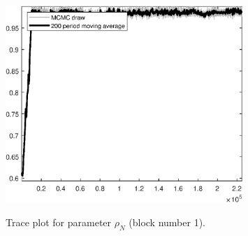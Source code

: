 \begin{figure}[H]
\centering
  \includegraphics[width=0.8\textwidth]{BRS_sectoral/graphs/TracePlot_rho_N_blck_1}\\
    \caption{Trace plot for parameter ${\rho_N}$ (block number 1).}
\end{figure}
